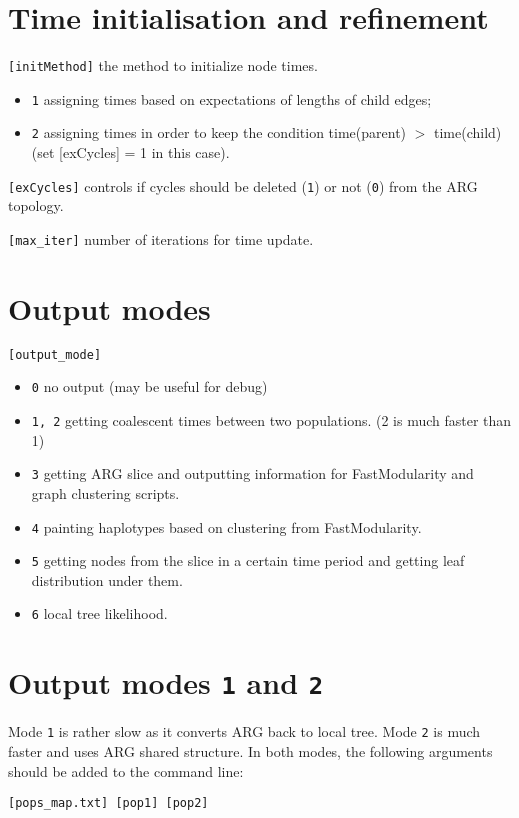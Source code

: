 \documentclass[11pt]{amsart}
\theoremstyle{definition}
\theoremstyle{remark}
\begin{document}
\section{Time initialisation and refinement}
	\texttt{[initMethod]} the method to initialize node times.
	\begin{itemize}
		\item \texttt{1} assigning times based on expectations of lengths of child edges;
		\item \texttt{2} assigning times in order to keep the condition time(parent) $>$ time(child) (set [exCycles] = 1 in this case).
	\end{itemize}
	
	\texttt{[exCycles]} controls if cycles should be deleted (\texttt{1}) or not (\texttt{0}) from the ARG topology.
	
	\texttt{[max\_iter]} number of iterations for time update.
	
\section{Output modes}

	\texttt{[output\_mode]}
	\begin{itemize}
		\item \texttt{0} no output (may be useful for debug)
		\item \texttt{1, 2} getting coalescent times between two populations. (2 is much faster than 1)
		\item \texttt{3} getting ARG slice and outputting information for FastModularity and graph clustering scripts.
		\item \texttt{4} painting haplotypes based on clustering from FastModularity.
		\item \texttt{5} getting nodes from the slice in a certain time period and getting leaf distribution under them.
		\item \texttt{6} local tree likelihood.
	\end{itemize}

\section{Output modes \texttt{1} and \texttt{2} }
	Mode \texttt{1} is rather slow as it converts ARG back to local tree. Mode \texttt{2} is much faster and uses ARG shared structure. In both modes, the following arguments should be added to the command line:
	\begin{displayquote}
		\texttt{[pops\_map.txt] [pop1] [pop2]}
	\end{displayquote}
	
\end{document}
